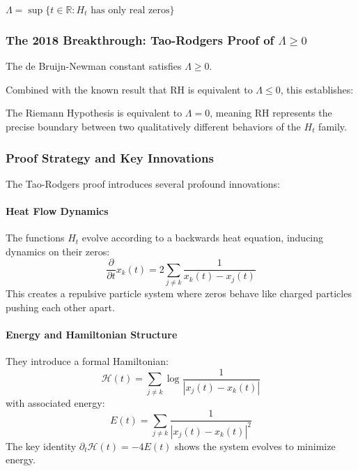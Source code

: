 \begin{definition}
\label{def:de_bruijn_newman_constant}
$\Lambda = \sup\{t \in \mathbb{R} : H_t \text{ has only real zeros}\}$
\end{definition}

\subsubsection{The 2018 Breakthrough: Tao-Rodgers Proof of $\Lambda \geq 0$}

\begin{theorem}
\label{thm:tao_rodgers}
The de Bruijn-Newman constant satisfies $\Lambda \geq 0$.
\end{theorem}

Combined with the known result that RH is equivalent to $\Lambda \leq 0$, this establishes:

\begin{corollary}
\label{cor:barely_true}
The Riemann Hypothesis is equivalent to $\Lambda = 0$, meaning RH represents the precise boundary between two qualitatively different behaviors of the $H_t$ family.
\end{corollary}

\subsubsection{Proof Strategy and Key Innovations}

The Tao-Rodgers proof introduces several profound innovations:

\paragraph{Heat Flow Dynamics} The functions $H_t$ evolve according to a backwards heat equation, inducing dynamics on their zeros:
\begin{equation}
\frac{\partial}{\partial t} x_k(t) = 2 \sum_{j \neq k} \frac{1}{x_k(t) - x_j(t)}
\end{equation}
This creates a repulsive particle system where zeros behave like charged particles pushing each other apart.

\paragraph{Energy and Hamiltonian Structure} They introduce a formal Hamiltonian:
\begin{equation}
\mathcal{H}(t) = \sum_{j \neq k} \log\frac{1}{|x_j(t) - x_k(t)|}
\end{equation}
with associated energy:
\begin{equation}
E(t) = \sum_{j \neq k} \frac{1}{|x_j(t) - x_k(t)|^2}
\end{equation}
The key identity $\partial_t \mathcal{H}(t) = -4E(t)$ shows the system evolves to minimize energy.

